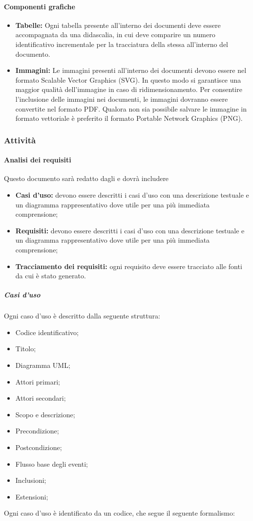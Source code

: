 \paragraph{Componenti grafiche}
	\begin{itemize}
	\item \textbf{Tabelle:} 
	Ogni tabella presente all'interno dei documenti deve essere accompagnata da una didascalia,	in cui deve comparire un numero identificativo incrementale per la tracciatura della stessa all'interno del documento.
	\item \textbf{Immagini:}
	Le immagini presenti all'interno dei documenti devono essere nel formato Scalable Vector Graphics (SVG). In questo modo si garantisce una maggior qualità dell'immagine in caso di ridimensionamento. Per consentire l’inclusione delle immagini nei documenti,
	le immagini dovranno essere convertite nel formato PDF. Qualora non sia possibile
	salvare le immagine in formato vettoriale è preferito il formato Portable Network
	Graphics (PNG).

	\end{itemize}
\subsubsection{Attività}
\paragraph{Analisi dei requisiti}
Questo documento sarà redatto dagli  e dovrà includere
\begin{itemize}
	\item{\textbf{Casi d'uso:}}  devono essere descritti i casi d’uso con una descrizione testuale e
	un diagramma rappresentativo dove utile per una più immediata comprensione;
	\item{\textbf{Requisiti:}}  devono essere descritti i casi d’uso con una descrizione testuale e
	un diagramma rappresentativo dove utile per una più immediata comprensione;
	\item{\textbf{Tracciamento dei requisiti:}}  ogni requisito deve essere tracciato alle fonti da cui è stato generato.
\end{itemize}
\subparagraph {Casi d'uso}
Ogni caso d'uso è descritto dalla seguente struttura:
\begin{itemize}
\item Codice identificativo;
\item Titolo;
\item Diagramma UML;
\item Attori primari;
\item Attori secondari;
\item Scopo e descrizione;
\item Precondizione;
\item Postcondizione;
\item Flusso base degli eventi;
\item Inclusioni;
\item Estensioni;
\end{itemize}
Ogni caso d’uso è identificato da un codice, che segue il seguente formalismo: \\

